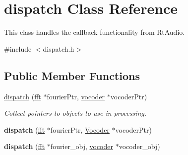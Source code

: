 \hypertarget{classdispatch}{\section{dispatch Class Reference}
\label{classdispatch}
}


This class handles the callback functionality from Rt\-Audio.  




{\ttfamily \#include $<$dispatch.\-h$>$}

\subsection*{Public Member Functions}
\begin{DoxyCompactItemize}
\item 
\hypertarget{classdispatch_a641ec1136a8fdecb8b9ab51fa672a848}{\hyperlink{classdispatch_a641ec1136a8fdecb8b9ab51fa672a848}{dispatch} (\hyperlink{classfft}{fft} $\ast$fourier\-Ptr, \hyperlink{classvocoder}{vocoder} $\ast$vocoder\-Ptr)}\label{classdispatch_a641ec1136a8fdecb8b9ab51fa672a848}

\begin{DoxyCompactList}\small\item\em Collect pointers to objects to use in processing. \end{DoxyCompactList}\item 
\hypertarget{classdispatch_a86ed8ac03c8498d7f75619af8eaff3a2}{{\bfseries dispatch} (\hyperlink{classfft}{fft} $\ast$fourier\-Ptr, \hyperlink{classVocoder}{Vocoder} $\ast$vocoder\-Ptr)}\label{classdispatch_a86ed8ac03c8498d7f75619af8eaff3a2}

\item 
\hypertarget{classdispatch_a49638cdbc0fee44e411973f09fc64d83}{{\bfseries dispatch} (\hyperlink{classfft}{fft} $\ast$fourier\-\_\-obj, \hyperlink{classvocoder}{vocoder} $\ast$vocoder\-\_\-obj)}\label{classdispatch_a49638cdbc0fee44e411973f09fc64d83}

\end{DoxyCompactItemize}
